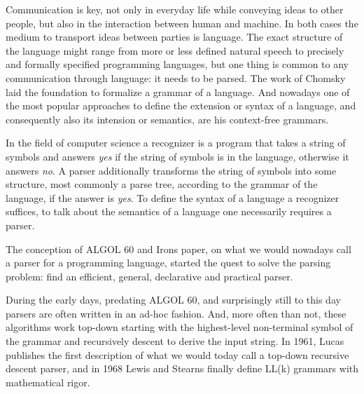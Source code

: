 %
\begin{isabellebody}%
%
%
\isadelimtheory
%
\endisadelimtheory
%
\isatagtheory
%
\endisatagtheory
{\isafoldtheory}%
%
\isadelimtheory
%
\endisadelimtheory
%
\isadelimdocument
%
\endisadelimdocument
%
\isatagdocument
%
\isamarkuptrue%
%
\endisatagdocument
{\isafolddocument}%
%
\isadelimdocument
%
\endisadelimdocument
%
\begin{isamarkuptext}%
Communication is key, not only in everyday life while conveying ideas to other people, but also in
the interaction between human and machine. In both cases the medium to transport ideas between parties
is language. The exact structure of the language might range from more or less defined natural
speech to precisely and formally specified programming languages, but one thing is common to any
communication through language: it needs to be parsed. The work of Chomsky \cite{Chomsky:1956} laid
the foundation to formalize a grammar of a language. And nowadays one of the most popular approaches
to define the extension or syntax of a language, and consequently also its intension or semantics, are
his context-free grammars.

In the field of computer science a recognizer is a program that takes a string of symbols
and answers \textit{yes} if the string of symbols is in the language, otherwise it answers \textit{no}. A parser additionally
transforms the string of symbols into some structure, most commonly a parse tree, according to the grammar
of the language, if the answer is \textit{yes}. To define the syntax of a language
a recognizer suffices, to talk about the semantics of a language one necessarily requires a parser.

The conception of ALGOL 60 \cite{Backus:1963} and Irons \cite{Irons:1961} paper,
on what we would nowadays call a parser for a programming language, started the quest
to solve the parsing problem: find an efficient, general, declarative and practical parser.

During the early days, predating ALGOL 60, and surprisingly still to this day parsers are often written in an ad-hoc fashion.
And, more often than not, these algorithms work top-down starting with the highest-level non-terminal symbol
of the grammar and recursively descent to derive the input string. In 1961, Lucas \cite{Lucas:1961}
publishes the first description of what we would today call a top-down recursive descent parser,
and in 1968 Lewis and Stearns \cite{Lewis:1968} finally define LL(k) grammars with mathematical rigor.


\end{isamarkuptext}
\end{isabellebody}

